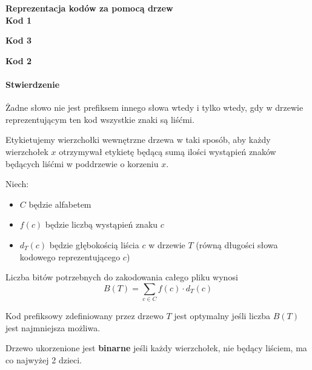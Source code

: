 \textbf{Reprezentacja kodów za pomocą drzew}\\
\textbf{Kod 1}

\textbf{Kod 3}

\textbf{Kod 2}

\paragraph{Stwierdzenie} Żadne słowo nie jest prefiksem innego słowa wtedy i tylko wtedy, gdy w drzewie reprezentującym ten kod wszystkie znaki są liśćmi.
\begin{center}
\end{center}

Etykietujemy wierzchołki wewnętrzne drzewa w taki sposób, aby każdy wierzchołek $x$ otrzymywał etykietę będącą sumą ilości wystąpień znaków będących liśćmi w poddrzewie o korzeniu $x$. 

Niech:
\begin{itemize}
\item $C$ będzie alfabetem
\item $f(c)$ będzie liczbą wystąpień znaku $c$
\item $d_T(c)$ będzie głębokością liścia $c$ w drzewie $T$ (równą długości słowa kodowego reprezentującego $c$)
\end{itemize}  Liczba bitów potrzebnych do zakodowania całego pliku wynosi 
$$B(T) = \sum_{c \in C} f(c) \cdot d_T(c)$$

Kod prefiksowy zdefiniowany przez drzewo $T$ jest optymalny jeśli liczba $B(T)$ jest najmniejsza możliwa.

Drzewo ukorzenione jest \textbf{binarne} jeśli każdy wierzchołek, nie będący liściem, ma co najwyżej 2 dzieci.

